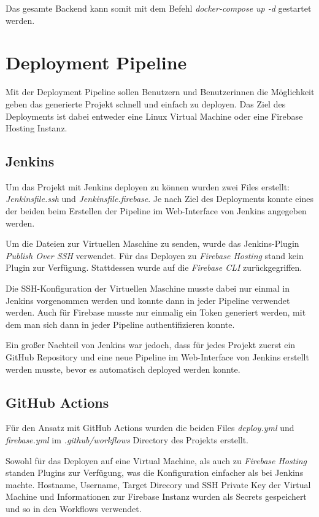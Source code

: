 Das gesamte Backend kann somit mit dem Befehl \textit{docker-compose up -d} gestartet werden.


\section{Deployment Pipeline}
Mit der Deployment Pipeline sollen Benutzern und Benutzerinnen die Möglichkeit geben das generierte Projekt schnell
und einfach zu deployen.
Das Ziel des Deployments ist dabei entweder eine Linux Virtual Machine oder eine Firebase Hosting Instanz.

\subsection{Jenkins}
Um das Projekt mit Jenkins deployen zu können wurden zwei Files erstellt: \textit{Jenkinsfile.ssh} und
\textit{Jenkinsfile.firebase}.
Je nach Ziel des Deployments konnte eines der beiden beim Erstellen der Pipeline im Web-Interface von Jenkins
angegeben werden.

Um die Dateien zur Virtuellen Maschine zu senden, wurde das Jenkins-Plugin \textit{Publish Over SSH}
verwendet.
Für das Deployen zu \textit{Firebase Hosting} stand kein Plugin zur Verfügung.
Stattdessen wurde auf die \textit{Firebase CLI} zurückgegriffen.

Die SSH-Konfiguration der Virtuellen Maschine musste dabei nur einmal in Jenkins vorgenommen werden und konnte
dann in jeder Pipeline verwendet werden.
Auch für Firebase musste nur einmalig ein Token generiert werden, mit dem man sich dann in jeder Pipeline
authentifizieren konnte.

Ein großer Nachteil von Jenkins war jedoch, dass für jedes Projekt zuerst ein GitHub
Repository und eine neue Pipeline im Web-Interface von Jenkins erstellt werden
musste, bevor es automatisch deployed werden konnte.

\subsection{GitHub Actions}
Für den Ansatz mit GitHub Actions wurden die beiden Files \textit{deploy.yml} und \textit{firebase.yml} im
\textit{.github/workflows} Directory des Projekts erstellt.

Sowohl für das Deployen auf eine Virtual Machine, als auch zu \textit{Firebase Hosting}
standen Plugins zur Verfügung, was die Konfiguration einfacher als bei Jenkins machte.
Hostname, Username, Target Direcory und SSH Private Key der Virtual Machine und Informationen zur Firebase Instanz
wurden als Secrets gespeichert und so in den Workflows verwendet.

